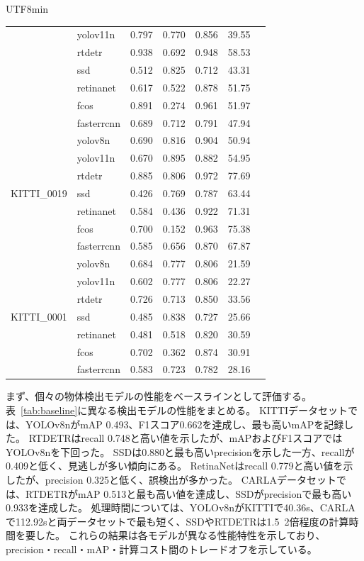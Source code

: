 \documentclass[conference, dvipdfmx]{IEEEtran}
\begin{document}
\begin{CJK}{UTF8}{min}
\begin{table}[t]
\begin{tabular}{llccccc}
    & yolov11n   & 0.797 & 0.770     & 0.856  & 39.55 \\
    & rtdetr     & 0.938 & 0.692     & 0.948  & 58.53 \\
    & ssd        & 0.512 & 0.825     & 0.712  & 43.31 \\
    & retinanet  & 0.617 & 0.522     & 0.878  & 51.75 \\
    & fcos       & 0.891 & 0.274     & 0.961  & 51.97 \\
    & fasterrcnn & 0.689 & 0.712     & 0.791  & 47.94 \\
    \midrule
    \multirow{7}{*}{KITTI\_0019}
    & yolov8n    & 0.690 & 0.816     & 0.904  & 50.94 \\
    & yolov11n   & 0.670 & 0.895     & 0.882  & 54.95 \\
    & rtdetr     & 0.885 & 0.806     & 0.972  & 77.69 \\
    & ssd        & 0.426 & 0.769     & 0.787  & 63.44 \\
    & retinanet  & 0.584 & 0.436     & 0.922  & 71.31 \\
    & fcos       & 0.700 & 0.152     & 0.963  & 75.38 \\
    & fasterrcnn & 0.585 & 0.656     & 0.870  & 67.87 \\
    \midrule
    \multirow{7}{*}{KITTI\_0001}
    & yolov8n    & 0.684 & 0.777     & 0.806  &21.59 \\
    & yolov11n   & 0.602 & 0.777     & 0.806  &22.27 \\
    & rtdetr     & 0.726 & 0.713     & 0.850  &33.56 \\
    & ssd        & 0.485 & 0.838     & 0.727  &25.66 \\
    & retinanet  & 0.481 & 0.518     & 0.820  &30.59 \\
    & fcos       & 0.702 & 0.362     & 0.874  &30.91 \\
    & fasterrcnn & 0.583 & 0.723     & 0.782  &28.16 \\
    \midrule
    \bottomrule
  \end{tabular}
\end{table}

まず、個々の物体検出モデルの性能をベースラインとして評価する。
表~\ref{tab:baseline}に異なる検出モデルの性能をまとめる。
KITTIデータセットでは、YOLOv8nがmAP 0.493、F1スコア0.662を達成し、最も高いmAPを記録した。
RTDETRはrecall 0.748と高い値を示したが、mAPおよびF1スコアではYOLOv8nを下回った。
SSDは0.880と最も高いprecisionを示した一方、recallが0.409と低く、見逃しが多い傾向にある。
RetinaNetはrecall 0.779と高い値を示したが、precision 0.325と低く、誤検出が多かった。
CARLAデータセットでは、RTDETRがmAP 0.513と最も高い値を達成し、SSDがprecisionで最も高い0.933を達成した。
処理時間については、YOLOv8nがKITTIで40.36s、CARLAで112.92sと両データセットで最も短く、SSDやRTDETRは1.5~2倍程度の計算時間を要した。
これらの結果は各モデルが異なる性能特性を示しており、precision・recall・mAP・計算コスト間のトレードオフを示している。


\end{CJK}
\end{document}
